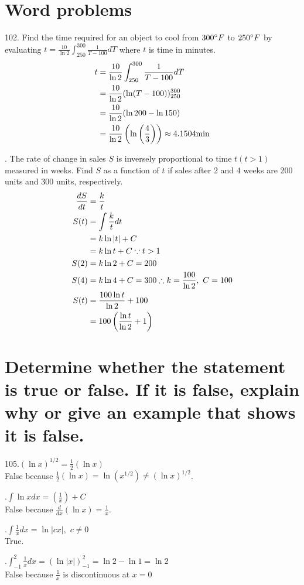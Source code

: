 \documentclass[11pt]{article}
\newcommand*{\vs}{\vspace{1cm}}
\newcommand*{\next}{\noindent}
\newcommand*{\set}{\setcounter{equation}{0}}
\newcommand*{\lt}{\left}
\newcommand*{\rt}{\right}
\begin{document}
\section{Word problems}
102. Find the time required for an object to cool from $300\degree F$ to $250\degree F$ by evaluating $t=\frac{10}{\ln 2}\int_{250}^{300}\frac{1}{T-100}dT$ where $t$ is time in minutes.
\begin{align}
    \set
    t&=\frac{10}{\ln 2}\int_{250}^{300}\frac{1}{T-100}dT\\
    &=\frac{10}{\ln 2}(\ln(T-100))_{250}^{300}\\
    &=\frac{10}{\ln 2}(\ln 200-\ln 150)\\
    &=\frac{10}{\ln 2}\lt(\ln\lt(\frac{4}{3}\rt)\rt)\approx 4.1504\text{min}
\end{align}

\vs\next
104. The rate of change in sales $S$ is inversely proportional to time $t(t>1)$ measured in weeks. Find $S$ as a function of $t$ if sales after 2 and 4 weeks are 200 units and 300 units, respectively.
\begin{align}
    \set
    \frac{dS}{dt}&=\frac{k}{t}\\
    S(t)&=\int\frac{k}{t}dt\\
    &=k\ln|t|+C\\
    &=k\ln t+C\because t>1\\
    S(2)&=k\ln 2+C=200\\
    S(4)&=k\ln 4+C=300\therefore k=\frac{100}{\ln 2},\,\, C=100\\
    S(t)&=\frac{100\ln t}{\ln 2}+100\\
    &=100\lt(\frac{\ln t}{\ln 2}+1\rt)
\end{align}

\section{Determine whether the
statement is true or false. If it is false, explain why or give an
example that shows it is false.}
105.$(\ln x)^{1/2}=\frac{1}{2}(\ln x)$\\
\indent False because $\frac{1}{2}(\ln x)=\ln(x^{1/2})\neq(\ln x)^{1/2}$.

\vs\next
106.$\int\ln xdx=\lt(\frac{1}{x}\rt)+C$\\
\indent False because $\frac{d}{dx}(\ln x)=\frac{1}{x}$.

\vs\next
107.$\int\frac{1}{x}dx=\ln|cx|,\,\, c\neq 0$\\
\indent True.

\vs\next
108.$\int_{-1}^{2}\frac{1}{x}dx=(\ln|x|)_{-1}^2=\ln 2-\ln 1=\ln 2$\\
\indent False because $\frac{1}{x}$ is discontinuous at $x=0$
\end{document}
